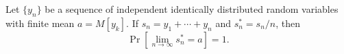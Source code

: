 Let $\{y_n\}$ be a sequence of independent identically distributed random variables with finite mean $a = M[y_k]$. If $s_n = y_1 + \cdots + y_n$ and $s_n^* = s_n/n$, then
$$\Pr\left[\lim_{n \to \infty} s_n^* = a\right] = 1.$$
